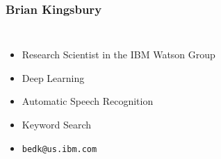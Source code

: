 \begin{frame}
  \frametitle{Brian Kingsbury}
  \begin{columns}[T]
    \column{2in}
    \begin{itemize}
    \item Research Scientist in the IBM Watson Group
    \item Deep Learning
    \item Automatic Speech Recognition
    \item Keyword Search
    \item \texttt{bedk@us.ibm.com}
    \end{itemize}
    \column{2in}
  \end{columns}
\end{frame}
